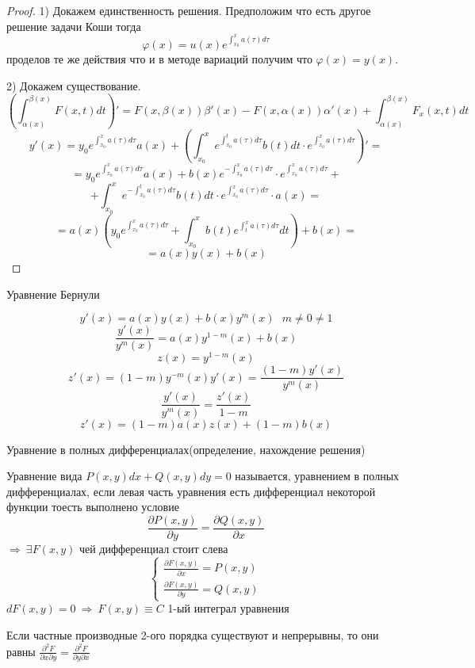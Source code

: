 \begin{proof}
  1) Докажем единственность решения. Предположим что есть другое решение задачи
  Коши тогда
  $$
  \varphi(x) = u(x) e^{\int_{x_0}^x a(\tau)d\tau}
  $$
  проделов те же действия что и в методе вариаций получим что
  $\varphi(x) = y(x)$.

  2) Докажем существование.
  $$
  \left( \int_{\alpha(x)}^{\beta(x)} F(x, t) dt \right)' =
  F(x, \beta(x)) \beta'(x) - F(x, \alpha(x)) \alpha'(x) +
  \int_{\alpha(x)}^{\beta(x)} F_x(x, t)dt
  $$
  $$
  y'(x) = y_0 e^{\int_{x_0}^x a(\tau) d\tau} a(x) + \left( \int_{x_0}^x
  e^{\int_{x_0}^t a(\tau) d\tau} b(t)dt \cdot
  e^{\int_{x_0}^x a(\tau)d\tau} \right)' =
  $$
  $$
  = y_0 e^{\int_{x_0}^x a(\tau)d\tau} a(x) + b(x)
  e^{-\int_{x_0}^x a(\tau) d\tau} \cdot e^{\int_{x_0}^x a(\tau) d\tau} +
  $$
  $$
  + \int_{x_0}^x e^{-\int_{x_0}^t a(\tau) d\tau} b(t) dt \cdot
  e^{\int_{x_0}^x a(\tau) d\tau} \cdot a(x)=
  $$
  $$
  = a(x) \left( y_0 e^{\int_{x_0}^x a(\tau) d\tau} + \int_{x_0}^x b(t)
  e^{\int_t^x a(\tau) d\tau} dt \right) + b(x) =
  $$
  $$
  = a(x)y(x) + b(x)
  $$
\end{proof}

\begin{title}[\Large]
  Уравнение Бернули
\end{title}

\begin{block}
  $$
  y'(x) = a(x)y(x) + b(x)y^m(x) ~~~ m \not= 0 \not= 1
  $$
  $$
  \frac{y'(x)}{y^m(x)} = a(x) y^{1 - m}(x) + b(x)
  $$
  $$
  z(x) = y^{1 - m}(x)
  $$
  $$
  z'(x) = (1 - m) y^{-m}(x) y'(x) = \frac{(1-m)y'(x)}{y^m(x)}
  $$
  $$
  \frac{y'(x)}{y^m(x)} = \frac{z'(x)}{1 - m}
  $$
  $$
  z'(x) = (1 - m) a(x)z(x) + (1 - m)b(x)
  $$
\end{block}

\begin{title}[\Large]
  Уравнение в полных дифференциалах(определение, нахождение решения)
\end{title}

\begin{define}
  Уравнение вида $P(x, y)dx + Q(x, y)dy = 0$ называется, уравнением в полных
  дифференциалах, если левая часть уравнения есть дифференциал некоторой
  функции тоесть выполнено условие
  $$
  \frac{\partial P(x, y)}{\partial y} = \frac{\partial Q(x, y)}{\partial x}
  $$
  $\Rightarrow ~ \exists F(x, y)$ чей дифференциал стоит слева
  $$
  \left\{
  \begin{array}{l}
    \frac{\partial F(x, y)}{\partial x} = P(x, y) \\
    \frac{\partial F(x, y)}{\partial y} = Q(x, y)
  \end{array}
  \right.
  $$
  $dF(x, y) = 0 ~ \Rightarrow ~ F(x, y) \equiv C$ 1-ый интеграл уравнения

  Если частные производные 2-ого порядка существуют и непрерывны, то они равны
  $\frac{\partial^2 F}{\partial x \partial y} =
  \frac{\partial^2 F}{\partial y \partial x}$
\end{define}

